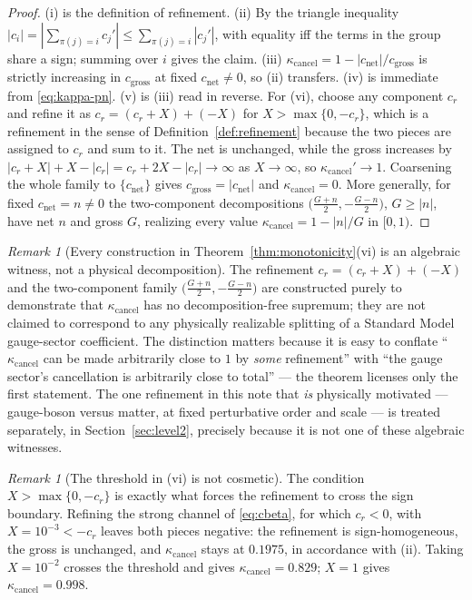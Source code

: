 \documentclass[11pt]{article}
\theoremstyle{definition}
\theoremstyle{remark}
\newtheorem{remark}[theorem]{Remark}
\newcommand{\net}{c_{\mathrm{net}}}
\newcommand{\gross}{c_{\mathrm{gross}}}
\newcommand{\kcancel}{\kappa_{\mathrm{cancel}}}
\begin{document}
\begin{proof}
(i) is the definition of refinement. (ii) By the triangle inequality $|c_i| = |\sum_{\pi(j)=i}
c_j'| \le \sum_{\pi(j)=i}|c_j'|$, with equality iff the terms in the group share a sign; summing
over $i$ gives the claim. (iii) $\kcancel = 1-|\net|/\gross$ is strictly increasing in $\gross$ at
fixed $\net \ne 0$, so (ii) transfers. (iv) is immediate from \eqref{eq:kappa-pn}. (v) is (iii) read
in reverse. For (vi), choose any component $c_r$ and refine it as $c_r = (c_r+X) + (-X)$ for
$X > \max\{0,-c_r\}$, which is a refinement in the sense of Definition~\ref{def:refinement} because
the two pieces are assigned to $c_r$ and sum to it. The net is unchanged, while the gross increases
by $|c_r+X|+X-|c_r| = c_r+2X-|c_r| \to \infty$ as $X\to\infty$, so $\kcancel' \to 1$. Coarsening the
whole family to $\{\net\}$ gives $\gross = |\net|$ and $\kcancel = 0$. More generally, for fixed
$\net = n \ne 0$ the two-component decompositions $\big(\tfrac{G+n}{2}, -\tfrac{G-n}{2}\big)$,
$G \ge |n|$, have net $n$ and gross $G$, realizing every value $\kcancel = 1-|n|/G$ in $[0,1)$.
\end{proof}

\begin{remark}[Every construction in Theorem~\ref{thm:monotonicity}(vi) is an algebraic witness,
not a physical decomposition]
\label{rem:witness}
The refinement $c_r = (c_r+X)+(-X)$ and the two-component family $\big(\tfrac{G+n}{2},
-\tfrac{G-n}{2}\big)$ are constructed purely to demonstrate that $\kcancel$ has no
decomposition-free supremum; they are not claimed to correspond to any physically realizable
splitting of a Standard Model gauge-sector coefficient. The distinction matters because it is easy
to conflate ``$\kcancel$ can be made arbitrarily close to $1$ by \emph{some} refinement'' with
``the gauge sector's cancellation is arbitrarily close to total'' --- the theorem licenses only the
first statement. The one refinement in this note that \emph{is} physically motivated ---
gauge-boson versus matter, at fixed perturbative order and scale --- is treated separately, in
Section~\ref{sec:level2}, precisely because it is not one of these algebraic witnesses.
\end{remark}

\begin{remark}[The threshold in (vi) is not cosmetic]
\label{rem:threshold}
The condition $X > \max\{0,-c_r\}$ is exactly what forces the refinement to cross the sign
boundary. Refining the strong channel of \eqref{eq:cbeta}, for which $c_r<0$, with
$X=10^{-3} < -c_r$ leaves both pieces negative: the refinement is sign-homogeneous, the gross is
unchanged, and $\kcancel$ stays at $0.1975$, in accordance with (ii). Taking $X=10^{-2}$ crosses the
threshold and gives $\kcancel = 0.829$; $X=1$ gives $\kcancel = 0.998$.
\end{remark}
\end{document}
